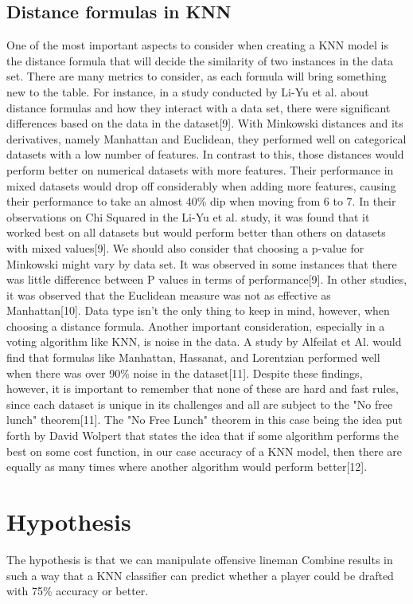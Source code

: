 \documentclass[confrence]{IEEEtran}
\begin{document}
\subsection*{Distance formulas in KNN}
One of the most important aspects to consider when creating a KNN model is the distance formula that will decide the similarity of two instances in the data set.
There are many metrics to consider, as each formula will bring something new to the table. For instance, in a study conducted by Li-Yu et al. about distance formulas and how they interact with a data set, there were significant differences based on the data in the dataset[9].
With Minkowski distances and its derivatives, namely Manhattan and Euclidean, they performed well on categorical datasets with a low number of features.
In contrast to this, those distances would perform better on numerical datasets with more features.
Their performance in mixed datasets would drop off considerably when adding more features, causing their performance to take an almost 40\% dip when moving from 6 to 7.
In their observations on Chi Squared in the Li-Yu et al. study, it was found that it worked best on all datasets but would perform better than others on datasets with mixed values[9].
We should also consider that choosing a p-value for Minkowski might vary by data set. It was observed in some instances that there was little difference between P values in terms of performance[9].
In other studies, it was observed that the Euclidean measure was not as effective as Manhattan[10]. Data type isn't the only thing to keep in mind, however, when choosing a distance formula.
Another important consideration, especially in a voting algorithm like KNN, is noise in the data. A study by Alfeilat et Al. would find that formulas like Manhattan, Hassanat, and Lorentzian performed well when there was over 90\% noise in the dataset[11].
Despite these findings, however, it is important to remember that none of these are hard and fast rules, since each dataset is unique in its challenges and all are subject to the "No free lunch" theorem[11].
The "No Free Lunch" theorem in this case being the idea put forth by David Wolpert that states the idea that if some algorithm performs the best on some cost function, in our case accuracy of a KNN model, then there are equally as many times where another algorithm would perform better[12].
\section*{Hypothesis}
The hypothesis is that we can manipulate offensive lineman Combine results in such a way that a KNN classifier can predict whether a player could be drafted with 75\% accuracy or better.
\end{document}
